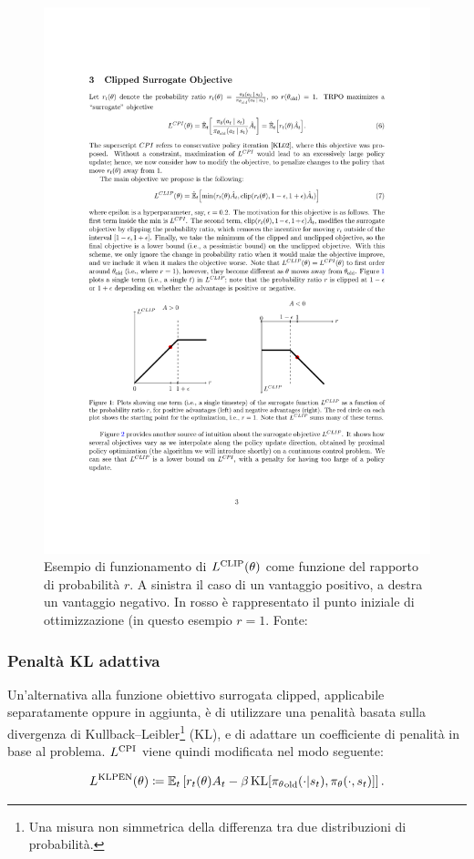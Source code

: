 \begin{figure}
    \centering
    \includegraphics[width=.7\linewidth]{assets/2/ppo_clip.pdf}
    \caption[Esempio di funzionamento di $L^{\textnormal{CLIP}}(\theta)$]{Esempio di funzionamento di $L^{\textnormal{CLIP}}(\theta)$ come funzione del rapporto di probabilità $r$. A sinistra il caso di un vantaggio positivo, a destra un vantaggio negativo. In rosso è rappresentato il punto iniziale di ottimizzazione (in questo esempio $r = 1$. Fonte: \cite{Schulman2017}}
    \label{fig:2_ppo_clip}
\end{figure}
    
\subsubsection{Penaltà KL adattiva}

Un'alternativa alla funzione obiettivo surrogata clipped, applicabile separatamente oppure in aggiunta, è di utilizzare una penalità basata sulla divergenza di Kullback–Leibler\footnote{Una misura non simmetrica della differenza tra due distribuzioni di probabilità.} (KL), e di adattare un coefficiente di penalità in base al problema. $L^{\textnormal{CPI}}$ viene quindi modificata nel modo seguente:

\begin{equation}
    L^{\textnormal{KLPEN}}(\theta) \coloneqq \mathbb{E}_t \left[ r_t(\theta) A_t - \beta \, \textnormal{KL}[{\pi_\theta}_\textnormal{old}(\cdot | s_t), \pi_\theta(\cdot, s_t)] \right].
\end{equation}


